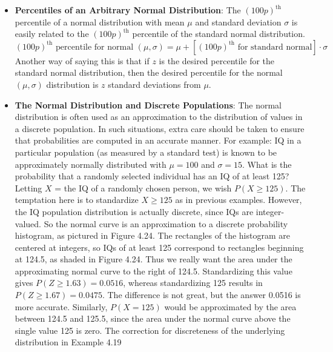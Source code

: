 \documentclass{report}
\begin{document}
\begin{itemize}
\[        \]
    \item \textbf{Percentiles of an Arbitrary Normal Distribution}:
        The \((100p)^{\text{th}}\) percentile of a normal distribution with mean \(\mu\) and standard deviation \(\sigma\) is easily related to the \((100p)^{\text{th}}\) percentile of the standard normal distribution.
        \[
            (100p)^{\text{th}} \text{ percentile for normal } (\mu, \sigma) = \mu + \left[ (100p)^{\text{th}} \text{ for standard normal} \right] \cdot \sigma
        \]
        Another way of saying this is that if \(z\) is the desired percentile for the standard normal distribution, then the desired percentile for the normal \((\mu, \sigma)\) distribution is \(z\) standard deviations from \(\mu\).

    \item \textbf{The Normal Distribution and Discrete Populations}:
        The normal distribution is often used as an approximation to the distribution of values in a discrete population. In such situations, extra care should be taken to ensure that probabilities are computed in an accurate manner.
        \bigbreak \noindent 
        For example:
        \bigbreak \noindent 
        IQ in a particular population (as measured by a standard test) is known to be approximately normally distributed with \( \mu = 100 \) and \( \sigma = 15 \). What is the probability that a randomly selected individual has an IQ of at least 125? Letting \( X \) = the IQ of a randomly chosen person, we wish \( P(X \geq 125) \). The temptation here is to standardize \( X \geq 125 \) as in previous examples. However, the IQ population distribution is actually discrete, since IQs are integer-valued. So the normal curve is an approximation to a discrete probability histogram, as pictured in Figure 4.24.
        \bigbreak \noindent 
        The rectangles of the histogram are centered at integers, so IQs of at least 125 correspond to rectangles beginning at 124.5, as shaded in Figure 4.24. Thus we really want the area under the approximating normal curve to the right of 124.5. Standardizing this value gives \( P(Z \geq 1.63) = 0.0516 \), whereas standardizing 125 results in \( P(Z \geq 1.67) = 0.0475 \). The difference is not great, but the answer 0.0516 is more accurate. Similarly, \( P(X = 125) \) would be approximated by the area between 124.5 and 125.5, since the area under the normal curve above the single value 125 is zero.
        \bigbreak \noindent 
        \bigbreak \noindent The correction for discreteness of the underlying distribution in Example 4.19

\end{itemize}
\end{document}
